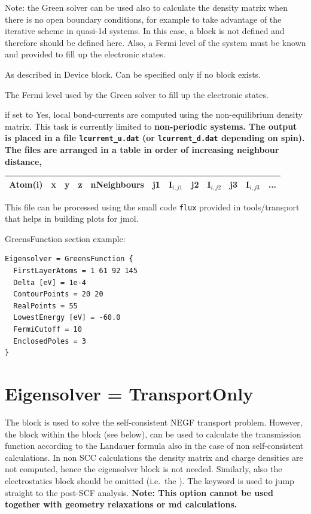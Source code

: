 \begin{description}
Note: the Green solver can be used also to calculate the density matrix when
there is no open boundary conditions, for example to take advantage of the
iterative scheme in quasi-1d systems. In this case, a  block is
not defined and therefore  should be defined here. Also, a
Fermi level of the system must be known and provided to fill up the electronic
states.

\item[\is{FirstLayerAtoms}] As described in Device block. Can be specified only
  if no  block exists.

\item[\is{FermiLevel}] The Fermi level used by the Green
  solver to fill up the electronic states.

\item[\is{LocalCurrents}] if set to Yes, local bond-currents are computed using
  the non-equilibrium density matrix.  This task is currently limited to
  \bf{non-periodic} systems. The output is placed in a file
  \verb|lcurrent_u.dat| (or \verb|lcurrent_d.dat| depending on spin).  The files
  are arranged in a table in order of increasing neighbour distance,

\begin{tabular}{|c|c|c|c|c|c|c|c|c|c|c|c|}
  \hline
  Atom(i) & x & y & z &  nNeighbours &  j1 & I$_{i,j1}$ & j2 & I$_{i,j2}$ &  j3 & I$_{i,j3}$ & ...\\
  \hline
\end{tabular}

  This file can be processed using the small code \verb|flux| provided in
  tools/transport that helps in building plots for jmol.
\end{description}

GreensFunction section example:

\begin{verbatim}
Eigensolver = GreensFunction {
  FirstLayerAtoms = 1 61 92 145
  Delta [eV] = 1e-4
  ContourPoints = 20 20
  RealPoints = 55
  LowestEnergy [eV] = -60.0
  FermiCutoff = 10
  EnclosedPoles = 3
}
\end{verbatim}


\section{Eigensolver = TransportOnly} 
The  block is used to solve the self-consistent NEGF 
transport problem. However, the block  within the 
 block (see below),  
can be used to calculate the transmission function according to the Landauer
formula also in the case of non self-consistent calculations. 
In non SCC calculations the density matrix and charge densities are not computed,
hence the eigensolver block is not needed. Similarly, also the electrostatics block
should be omitted (i.e.\ the ).
The keyword  is used to jump straight to the 
post-SCF analysis.
\bf{Note:} This option cannot be used together with geometry relaxations or md 
calculations.



